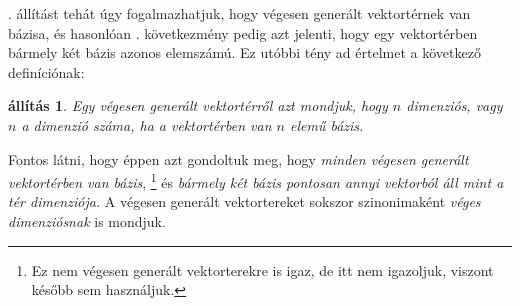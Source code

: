 \documentclass[9pt, showtrims]{memoir}
\let\Aref\relax
\theoremstyle{plain}
\newtheorem{proposition}{állítás}[section]
\theoremstyle{remark}
\theoremstyle{definition}
\begin{document}
\Aref{pr:bazisletezik}. állítást tehát úgy fogalmazhatjuk, hogy végesen generált vektortérnek van bázisa,
és hasonlóan . következmény pedig azt jelenti, 
hogy egy vektortérben bármely két bázis azonos elemszámú.
Ez utóbbi tény ad értelmet a következő definíciónak:
\begin{proposition}
    Egy végesen generált vektortérről azt mondjuk, hogy $n$ dimenziós, vagy $n$ a dimenzió száma,
    ha a vektortérben van $n$ elemű bázis.
\end{proposition}
Fontos látni, hogy éppen azt gondoltuk meg, hogy \emph{minden végesen generált vektortérben van bázis}, 
\footnote{Ez nem végesen generált vektorterekre is igaz, de itt nem igazoljuk, 
viszont később sem használjuk.}
és \emph{bármely két bázis pontosan annyi vektorból áll mint a tér dimenziója.}
A végesen generált vektortereket sokszor szinonimaként \emph{véges dimenziósnak} is mondjuk.
\end{document}
